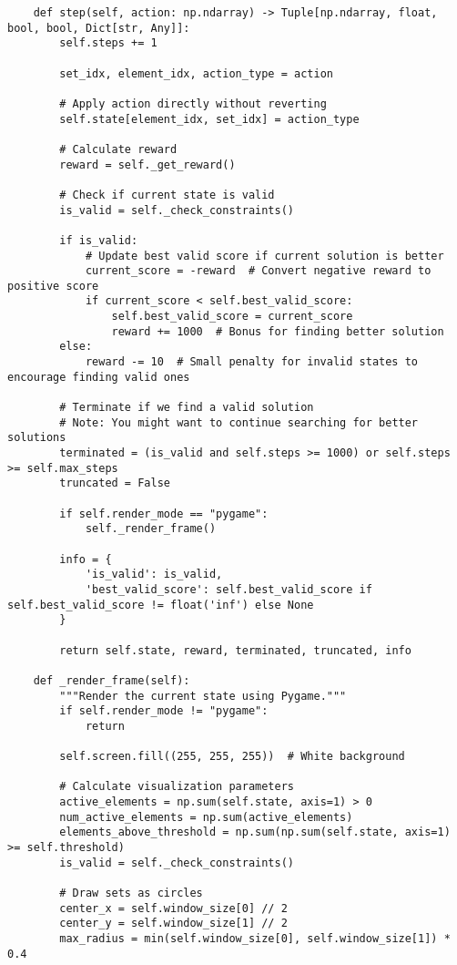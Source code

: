 \begin{lstlisting}
    def step(self, action: np.ndarray) -> Tuple[np.ndarray, float, bool, bool, Dict[str, Any]]:
        self.steps += 1
        
        set_idx, element_idx, action_type = action
        
        # Apply action directly without reverting
        self.state[element_idx, set_idx] = action_type
        
        # Calculate reward
        reward = self._get_reward()
        
        # Check if current state is valid
        is_valid = self._check_constraints()
        
        if is_valid:
            # Update best valid score if current solution is better
            current_score = -reward  # Convert negative reward to positive score
            if current_score < self.best_valid_score:
                self.best_valid_score = current_score
                reward += 1000  # Bonus for finding better solution
        else:
            reward -= 10  # Small penalty for invalid states to encourage finding valid ones
        
        # Terminate if we find a valid solution
        # Note: You might want to continue searching for better solutions
        terminated = (is_valid and self.steps >= 1000) or self.steps >= self.max_steps
        truncated = False
        
        if self.render_mode == "pygame":
            self._render_frame()
        
        info = {
            'is_valid': is_valid,
            'best_valid_score': self.best_valid_score if self.best_valid_score != float('inf') else None
        }
        
        return self.state, reward, terminated, truncated, info
    
    def _render_frame(self):
        """Render the current state using Pygame."""
        if self.render_mode != "pygame":
            return
            
        self.screen.fill((255, 255, 255))  # White background
        
        # Calculate visualization parameters
        active_elements = np.sum(self.state, axis=1) > 0
        num_active_elements = np.sum(active_elements)
        elements_above_threshold = np.sum(np.sum(self.state, axis=1) >= self.threshold)
        is_valid = self._check_constraints()
        
        # Draw sets as circles
        center_x = self.window_size[0] // 2
        center_y = self.window_size[1] // 2
        max_radius = min(self.window_size[0], self.window_size[1]) * 0.4
        

\end{lstlisting}
